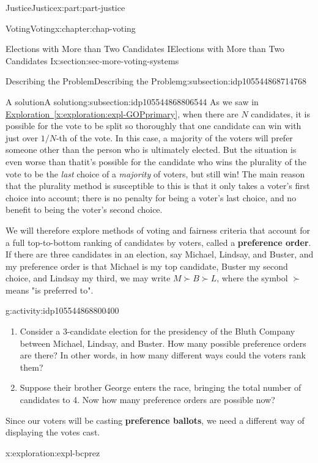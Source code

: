 \documentclass[oneside,10pt,]{book}
\newcommand{\xreffont}{\relax}
\newcommand{\terminology}[1]{\textbf{#1}}
\numberwithin{equation}{section}
\begin{document}
\begin{partptx}{Justice}{}{Justice}{}{}{x:part:part-justice}
\begin{chapterptx}{Voting}{}{Voting}{}{}{x:chapter:chap-voting}
\begin{sectionptx}{Elections with More than Two Candidates I}{}{Elections with More than Two Candidates I}{}{}{x:section:sec-more-voting-systems}
\begin{subsectionptx}{Describing the Problem}{}{Describing the Problem}{}{}{g:subsection:idp105544868714768}
\end{subsectionptx}
%
%
\typeout{************************************************}
\typeout{************************************************}
%
\begin{subsectionptx}{A solution}{}{A solution}{}{}{g:subsection:idp105544868806544}
As we saw in \hyperref[x:exploration:expl-GOPprimary]{Exploration~{\xreffont\ref{x:exploration:expl-GOPprimary}}}, when there are \(N\) candidates, it is possible for the vote to be split so thoroughly that one candidate can win with just over \(1/N\)-th of the vote. In this case, a majority of the voters will prefer someone other than the person who is ultimately elected. But the situation is even worse than that\textemdash{}it's possible for the candidate who wins the plurality of the vote to be the \emph{last} choice of a \emph{majority} of voters, but still win! The main reason that the plurality method is susceptible to this is that it only takes a voter's first choice into account; there is no penalty for being a voter's last choice, and no benefit to being the voter's second choice.%
\par
{} We will therefore explore methods of voting and fairness criteria that account for a full top-to-bottom ranking of candidates by voters, called a \terminology{preference order}. If there are three candidates in an election, say Michael, Lindsay, and Buster, and my preference order is that Michael is my top candidate, Buster my second choice, and Lindsay my third, we may write \(M \succ B \succ L\), where the symbol \(\succ\) means "is preferred to".%
\begin{activity}{}{g:activity:idp105544868800400}%
%
\begin{enumerate}
\item{}Consider a 3-candidate election for the presidency of the Bluth Company between Michael, Lindsay, and Buster. How many possible preference orders are there? In other words, in how many different ways could the voters rank them?%
\item{}Suppose their brother George enters the race, bringing the total number of candidates to 4. Now how many preference orders are possible now?%
\end{enumerate}
\end{activity}%
 Since our voters will be casting \terminology{preference ballots}, we need a different way of displaying the votes cast.%
\begin{exploration}{}{x:exploration:expl-bcprez}%

\end{exploration}
\end{subsectionptx}
\end{sectionptx}
\end{chapterptx}
\end{partptx}
\end{document}
